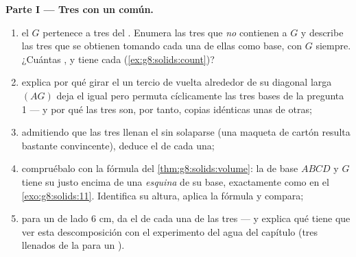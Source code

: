 \begin{problem}
\medskip
\noindent\textbf{Parte I --- Tres  con un  común.}
\begin{enumerate}
  \item el  $G$ pertenece a tres  del . Enumera
        las tres  que \emph{no} contienen a $G$ y
        describe las tres  que se obtienen tomando cada una de
        ellas como base, con  $G$ siempre. ¿Cuántas ,
         y  tiene cada 
        (\cref{ex:g8:solids:count})?
  \item explica por qué girar el  un tercio de vuelta alrededor de
        su diagonal larga $(AG)$ deja el  igual pero
        permuta cíclicamente las tres bases de la pregunta 1 ---
        y por qué las tres  son, por tanto, copias
        idénticas unas de otras;
  \item admitiendo que las tres  llenan el  sin
        solaparse (una maqueta de cartón resulta bastante convincente),
        deduce el  de cada una;
  \item compruébalo con la fórmula del
        \cref{thm:g8:solids:volume}: la  de base $ABCD$
        y  $G$ tiene su  justo encima de una \emph{esquina}
        de su base, exactamente como en el \cref{exo:g8:solids:11}.
        Identifica su altura, aplica la fórmula y compara;
  \item para un  de lado $6$ cm, da el  de cada una de las
        tres  --- y explica qué tiene que ver esta descomposición
        con el experimento del agua del
        capítulo (tres llenados de la  para un ).
\end{enumerate}


\end{problem}
